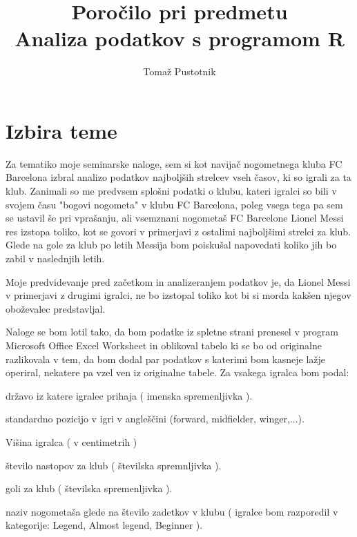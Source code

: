 \documentclass[11pt,a4paper]{article}
\begin{document}
\title{Poročilo pri predmetu \\
Analiza podatkov s programom R}
\author{Tomaž Pustotnik}
\maketitle

\section{Izbira teme}

Za tematiko moje seminarske naloge, sem si kot navijač nogometnega kluba FC Barcelona izbral analizo podatkov najboljših strelcev vseh časov, ki so igrali za ta klub. Zanimali so me predvsem splošni podatki o klubu, kateri igralci so bili v svojem času "bogovi nogometa" v klubu FC Barcelona, poleg vsega tega pa sem se ustavil še pri vprašanju, ali vsemznani nogometaš FC Barcelone Lionel Messi res izstopa toliko, kot se govori v primerjavi z ostalimi najboljšimi strelci za klub. Glede na gole za klub po letih Messija bom poiskušal napovedati koliko jih bo zabil v naslednjih letih.

Moje predvidevanje pred začetkom in analizeranjem podatkov je, da Lionel Messi v primerjavi z drugimi igralci, ne bo izstopal toliko kot bi si morda kakšen njegov oboževalec predstavljal.

Naloge se bom lotil tako, da bom podatke iz spletne strani prenesel v program Microsoft Office Excel Worksheet in oblikoval tabelo ki se bo od originalne razlikovala v tem, da bom dodal par podatkov s katerimi bom kasneje lažje operiral, nekatere pa vzel ven iz originalne tabele. Za vsakega igralca bom podal:
\itemize
\item državo iz katere igralec prihaja ( imenska spremenljivka ).

\item standardno pozicijo v igri v angleščini (forward, midfielder, winger,...).

\item Višina igralca ( v centimetrih )

\item število nastopov za klub ( številska spremnljivka ).

\item goli za klub ( številska spremenljivka ).

\item naziv nogometaša glede na število zadetkov v klubu ( igralce bom razporedil v kategorije: Legend, Almost legend, Beginner ).
\end{document}

